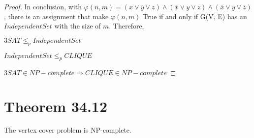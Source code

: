 \documentclass{article}
\begin{document}
\begin{proof}
    In conclusion, with $ \varphi (n, m) = (x  \lor \bar{y} \lor z) \land (\bar{x}  \lor y \lor z) \land (\bar{x}  \lor y \lor \bar{z}) $,
    there is an assignment that make $ \varphi (n, m) $ True if and only if  G(V, E) has an $ IndependentSet $ with the size of $m$. 
    Therefore,

        $3SAT \leq_p IndependentSet$

        $IndependentSet \leq_p CLIQUE$

        $3SAT \in NP-complete \Rightarrow CLIQUE \in NP-complete$


\end{proof} 

\section*{Theorem 34.12}
    The vertex cover problem is NP-complete.
\end{document}
